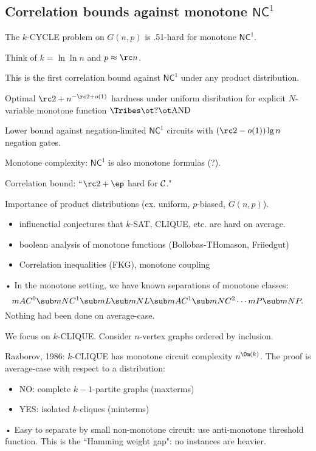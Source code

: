 \subsection{Correlation bounds against monotone $\mathsf{NC}^1$}

\begin{thm}
The $k$-CYCLE problem on $G(n,p)$ is .51-hard for monotone $\mathsf{NC}^1$. 
\end{thm}

Think of $k=\ln \ln n$ and $p\approx \rc n$.

This is the first correlation bound against $\mathsf{NC}^1$ under any product distribution.

\begin{cor}
Optimal $\rc2+n^{-\rc2+o(1)}$ hardness under uniform disribution for explicit $N$-variable monotone function $\Tribes \ot?\ot \text{AND}$

Lower bound against negation-limited $\mathsf{NC}^1$ circuits with $(\rc2-o(1))\lg n$ negation gates.
\end{cor}

%
Monotone complexity: $\mathsf{NC}^1$ is also monotone formulas (?).

Correlation bound: ``$\rc2+\ep$ hard for $\cal C$."

%
Importance of product distributions (ex. uniform, $p$-biased, $G(n,p)$).
\begin{itemize}
\item
influenctial conjectures that $k$-SAT, CLIQUE, etc. are hard on average.
\item
boolean analysis of monotone functions (Bollobas-THomason, Friiedgut)
\item
Correlation inequalities (FKG), monotone coupling
\end{itemize}•
In the monotone setting, we have known separations of monotone classes:
\[
mAC^0\sub mNC^1\sub mL\sub mNL\sub mAC^1\sub mNC^2\cdots mP\sub mNP.
\]
Nothing had been done on average-case.

We focus on $k$-CLIQUE. Consider $n$-vertex graphs ordered by inclusion.

Razborov, 1986: $k$-CLIQUE has monotone circuit complexity $n^{\Om(k)}$. The proof is average-case with respect to a distribution:
\begin{itemize}
\item
NO: complete $k-1$-partite graphs (maxterms)
\item
YES: isolated $k$-cliques (minterms)
\end{itemize}•
Easy to separate by small non-monotone circuit: use anti-monotone threshold function.
This is the ``Hamming weight gap": no instances are heavier.


